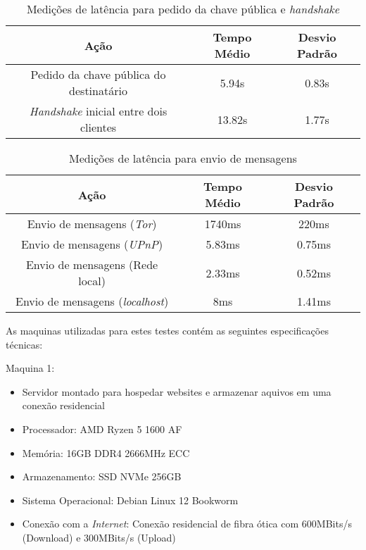 \begin{table}[H]
\centering
\begin{tabular}{|c|c|c|}
\hline
\textbf{Ação} & \textbf{Tempo Médio} & \textbf{Desvio Padrão} \\ \hline
Pedido da chave pública do destinatário & 5.94s & 0.83s \\ \hline
\textit{Handshake} inicial entre dois clientes & 13.82s & 1.77s \\ \hline
\end{tabular}
\caption{Medições de latência para pedido da chave pública e \textit{handshake}}
\label{tab:latencia_handshake}
\end{table}

\begin{table}[H]
\centering
\begin{tabular}{|c|c|c|}
\hline
\textbf{Ação} & \textbf{Tempo Médio} & \textbf{Desvio Padrão} \\ \hline
Envio de mensagens (\textit{Tor}) & 1740ms & 220ms \\ \hline
Envio de mensagens (\textit{UPnP}) & 5.83ms & 0.75ms \\ \hline
Envio de mensagens (Rede local) & 2.33ms & 0.52ms \\ \hline
Envio de mensagens (\textit{localhost}) & 8ms & 1.41ms \\ \hline
\end{tabular}
\caption{Medições de latência para envio de mensagens}
\label{tab:latencia_mensagens}
\end{table}

As maquinas utilizadas para estes testes contém as seguintes especificações técnicas:

Maquina 1:

\begin{tcolorbox}[colback=gray!10, colframe=gray, sharp corners=south]
\begin{itemize}
    \setlength\itemsep{0em}
    \setlength\leftmargini{2em}
    \item Servidor montado para hospedar websites e armazenar aquivos em uma conexão residencial
    \item Processador: AMD Ryzen 5 1600 AF
    \item Memória: 16GB DDR4 2666MHz ECC
    \item Armazenamento: SSD NVMe 256GB
    \item Sistema Operacional: Debian Linux 12 Bookworm
    \item Conexão com a \textit{Internet}: Conexão residencial de fibra ótica com 600MBits/s (Download) e 300MBits/s (Upload)
\end{itemize}
\end{tcolorbox}

